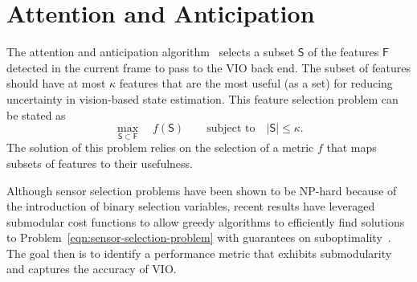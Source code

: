 
\section{Attention and Anticipation}\label{sec:anticipation}

The attention and anticipation algorithm~\cite{Carlone2017} selects a subset $\mathsf{S}$ of the features $\mathsf{F}$ detected in the current frame to pass to the VIO back end.
The subset of features should have at most $\kappa$ features that are the most useful (as a set) for reducing uncertainty in vision-based state estimation.
This feature selection problem can be stated as
\begin{equation}\label{eqn:sensor-selection-problem}
\max_{\mathsf{S}\subset\mathsf{F}} \quad f(\mathsf{S}) \qquad \text{subject to}\quad |\mathsf{S}|\le\kappa.
\end{equation}
The solution of this problem relies on the selection of a metric $f$ that maps subsets of features to their usefulness.

Although sensor selection problems have been shown to be NP-hard because of the introduction of binary selection variables, recent results have leveraged submodular cost functions to allow greedy algorithms to efficiently find solutions to Problem~\eqref{eqn:sensor-selection-problem} with guarantees on suboptimality~\cite{Shamaiah2010}.
The goal then is to identify a performance metric that exhibits submodularity and captures the accuracy of VIO.

